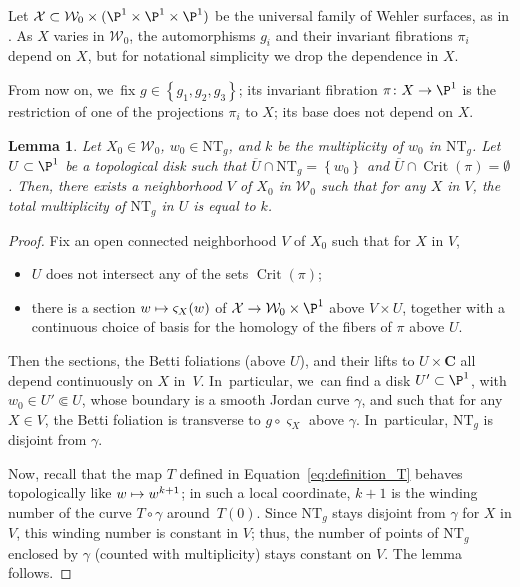 \documentclass[JEP,XML,SOM,Unicode,published]{cedram}
\newcommand\mto{\mathchoice{\longmapsto}{\mapsto}{\mapsto}{\mapsto}}
\newcommand{\set}[1]{\left\{#1\right\}}
\DeclareMathOperator{\Crit}{Crit}
\def\C{\mathbf{C}}
\newcommand{\cX}{\mathcal{X}}
\newcommand{\cW}{\mathcal{W}}
\newcommand{\NT}{{\mathrm{NT}}}
\theoremstyle{plain}
\newtheorem{lem}[thm]{Lemma}
\theoremstyle{definition}
\begin{document}
Let $\cX\subset \cW_0\times (\P^1\times \P^1\times \P^1)$ be
the universal family of Wehler surfaces, as in \cite[\S 2]{finite_orbits}.
As $X$ varies in $ \cW_0$, the automorphisms $g_i$ and their
invariant fibrations $\pi_i$ depend on $X$, but for notational simplicity we drop the dependence in $X$.

From now on, we~fix $g\in \set{g_1, g_2, g_3}$; its invariant fibration $\pi\colon X\to \P^1$ is the restriction of one of the projections $\pi_i$ to $X$; its base does not depend on $X$.

\begin{lem}\label{lem:NT_local}
Let $X_0\in \cW_0$, $w_0\in \NT_g$, and $k$ be the multiplicity of $w_0$ in $\NT_g$.
Let $U\subset \P^1$ be a topological disk such that $\overline U\cap \NT_g = \set{w_0}$ and $\overline U\cap \Crit(\pi)=\emptyset$.
Then, there exists a neighborhood $V$
of $X_0$ in $\cW_0$ such that for any $X$ in $V$, the total multiplicity of
$\NT_g$ in $U$ is equal to $k$.
\end{lem}

\begin{proof}
Fix an open connected neighborhood $V$ of $X_0$ such that for $X$ in $V$,
\begin{itemize}
\item $U$ does not intersect any of the sets $\Crit(\pi)$;
\item there is a section $w\mto \varsigma_X(w)$
of $\cX\to \cW_0\times \P^1$ above $V\times U$, together with a continuous choice of basis for the homology of the fibers of $\pi$ above $U$.
\end{itemize}
Then the sections, the Betti foliations (above $U$), and their lifts to $U\times \C$ all
depend continuously on $X$ in~$V$. In~particular, we~can find a disk $U'\subset \P^1$, with
$w_0\in U'\Subset U$, whose boundary is a
smooth Jordan curve $\gamma$, and such that
for any $X\in V$, the Betti foliation is transverse to $g\circ \varsigma_X$ above $\gamma$. In~particular,
$\NT_g$ is disjoint from $\gamma$.

Now, recall that the map $T$ defined in Equation~\eqref{eq:definition_T}
behaves topologically like $w\mto w^{k+1}$; in such a local coordinate,
$k+1$ is the winding number of the curve $T\circ \gamma$ around~$T(0)$.
Since $\NT_g$ stays disjoint from $\gamma$ for $X$ in $V$,
this winding number is constant in $V$; thus, the number of points of $\NT_g$ enclosed by $\gamma$ (counted with multiplicity) stays constant on $V$. The
lemma follows.
\end{proof}
\end{document}
